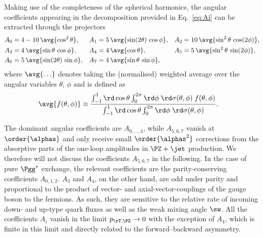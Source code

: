 Making use of the completeness of the spherical harmonics, the angular coefficients appearing in the decomposition provided
in Eq.~\eqref{eq:Ai} can be extracted through the projectors
\begin{align}
  A_0 &= 4-10 \, \avg{\cos^2\theta} , &
  A_1 &= 5 \, \avg{\sin(2\theta) \, \cos\phi} , &
  A_2 &= 10 \, \avg{\sin^2\theta \, \cos(2\phi)} , \nonumber \\
  A_3 &= 4 \, \avg{\sin\theta \, \cos\phi} , &
  A_4 &= 4 \, \avg{\cos\theta} , &
  A_5 &= 5 \, \avg{\sin^2\theta \, \sin(2\phi)} , \nonumber \\
  A_6 &= 5 \, \avg{\sin(2\theta) \, \sin\phi} , &
  A_7 &= 4 \, \avg{\sin\theta \, \sin\phi} , 
  \label{eq:Ai_proj}
\end{align}
where $\avg{\ldots}$ denotes taking the (normalised) weighted average over the angular variables $\theta$, $\phi$ and is defined as
\begin{align}
  \avg{f(\theta, \phi)} &\equiv 
  \frac{
    \int_{-1}^{1} \rd\cos\theta \int_0^{2\pi} \rd\phi \; 
    \rd\sigma(\theta,\phi) \;
    f(\theta, \phi)
  }{
    \int_{-1}^{1} \rd\cos\theta \int_0^{2\pi} \rd\phi \; 
    \rd\sigma(\theta,\phi)
  } .
  \label{eq:proj}
\end{align}

The dominant angular coefficients are $A_{0,\ldots,4}$, while $A_{5,6,7}$ vanish at $\order{\alphas}$ and only receive small $\order{\alphas^2}$ corrections from the absorptive parts of the one-loop amplitudes in $\PZ+\jet$ production.
We therefore will not discuss the coefficients $A_{5,6,7}$ in the following.
In the case of pure $\Pgg^*$ exchange, the relevant coefficients are the parity-conserving coefficients $A_{0,1,2}$.
$A_3$ and $A_4$, on the other hand, are odd under parity and proportional to the product of vector- and axial-vector-couplings of the gauge boson to the fermions.
As such, they are sensitive to the relative rate of incoming down- and up-type quark fluxes as well as the weak mixing angle $\sw$.
All the coefficients $A_i$ vanish in the limit $\ptz\to0$ with the exception of $A_4$, which is finite in this limit and directly related to the forward--backward asymmetry.

